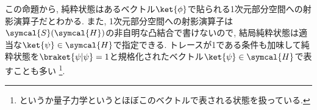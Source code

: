 この命題から, 純粋状態はあるベクトル$\ket{\phi}$で貼られる1次元部分空間への射影演算子だとわかる. 
また, 1次元部分空間への射影演算子は$\symcal{S}(\symcal{H})$の非自明な凸結合で書けないので, 結局純粋状態は適当な$\ket{\psi}\in\symcal{H}$で指定できる. 
トレースが1である条件も加味して純粋状態を$\braket{\psi|\psi}=1$と規格化されたベクトル$\ket{\psi}\in\symcal{H}$で表すことも多い
\footnote{というか量子力学というとほぼこのベクトルで表される状態を扱っている. }. 





